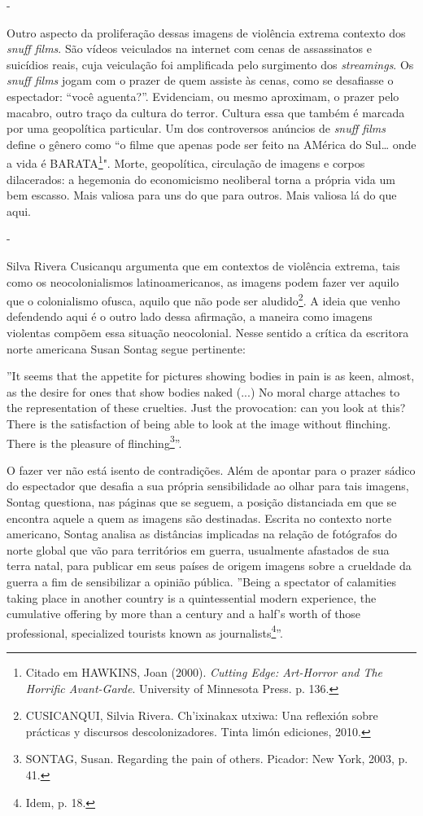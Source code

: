 -

Outro aspecto da proliferação dessas imagens de violência extrema
contexto dos \emph{snuff films}. São vídeos veiculados na internet com
cenas de assassinatos e suicídios reais, cuja veiculação foi amplificada
pelo surgimento dos \emph{streamings}. Os \emph{snuff films} jogam com o
prazer de quem assiste às cenas, como se desafiasse o espectador: ``você
aguenta?''. Evidenciam, ou mesmo aproximam, o prazer pelo macabro, outro
traço da cultura do terror. Cultura essa que também é marcada por uma
geopolítica particular. Um dos controversos anúncios de \emph{snuff
films} define o gênero como ``o filme que apenas pode ser feito na
AMérica do Sul\ldots{} onde a vida é BARATA\footnote{Citado em HAWKINS,
  Joan (2000). \emph{Cutting Edge: Art-Horror and The Horrific
  Avant-Garde}. University of Minnesota Press. p. 136.}". Morte,
geopolítica, circulação de imagens e corpos dilacerados: a hegemonia do
economicismo neoliberal torna a própria vida um bem escasso. Mais
valiosa para uns do que para outros. Mais valiosa lá do que aqui.

-

Silva Rivera Cusicanqu argumenta que em contextos de violência extrema,
tais como os neocolonialismos latinoamericanos, as imagens podem fazer
ver aquilo que o colonialismo ofusca, aquilo que não pode ser
aludido\footnote{CUSICANQUI, Silvia Rivera. Ch'ixinakax utxiwa: Una
  reflexión sobre prácticas y discursos descolonizadores. Tinta limón
  ediciones, 2010.}. A ideia que venho defendendo aqui é o outro lado
dessa afirmação, a maneira como imagens violentas compõem essa situação
neocolonial. Nesse sentido a crítica da escritora norte americana Susan
Sontag segue pertinente:

''It seems that the appetite for pictures showing bodies in pain is as
keen, almost, as the desire for ones that show bodies naked (...) No
moral charge attaches to the representation of these cruelties. Just the
provocation: can you look at this? There is the satisfaction of being
able to look at the image without flinching. There is the pleasure of
flinching\footnote{SONTAG, Susan. Regarding the pain of others. Picador:
  New York, 2003, p. 41.}''.

O fazer ver não está isento de contradições. Além de apontar para o
prazer sádico do espectador que desafia a sua própria sensibilidade ao
olhar para tais imagens, Sontag questiona, nas páginas que se seguem, a
posição distanciada em que se encontra aquele a quem as imagens são
destinadas. Escrita no contexto norte americano, Sontag analisa as
distâncias implicadas na relação de fotógrafos do norte global que vão
para territórios em guerra, usualmente afastados de sua terra natal,
para publicar em seus países de origem imagens sobre a crueldade da
guerra a fim de sensibilizar a opinião pública. ''Being a spectator of
calamities taking place in another country is a quintessential modern
experience, the cumulative offering by more than a century and a half's
worth of those professional, specialized tourists known as
journalists\footnote{Idem, p. 18.}''.

